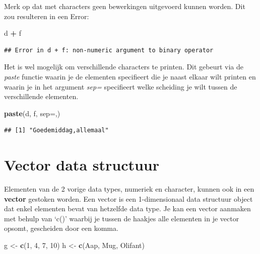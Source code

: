 \documentclass[
]{book}
\newenvironment{Shaded}{\begin{snugshade}}{\end{snugshade}}
\newcommand{\AttributeTok}[1]{\textcolor[rgb]{0.13,0.29,0.53}{#1}}
\newcommand{\DecValTok}[1]{\textcolor[rgb]{0.00,0.00,0.81}{#1}}
\newcommand{\FunctionTok}[1]{\textcolor[rgb]{0.13,0.29,0.53}{\textbf{#1}}}
\newcommand{\NormalTok}[1]{#1}
\newcommand{\OtherTok}[1]{\textcolor[rgb]{0.56,0.35,0.01}{#1}}
\newcommand{\SpecialCharTok}[1]{\textcolor[rgb]{0.81,0.36,0.00}{\textbf{#1}}}
\newcommand{\StringTok}[1]{\textcolor[rgb]{0.31,0.60,0.02}{#1}}
\begin{document}
Merk op dat met characters geen bewerkingen uitgevoerd kunnen worden.
Dit zou resulteren in een Error:

\begin{Shaded}
\begin{Highlighting}[]
\NormalTok{d }\SpecialCharTok{+}\NormalTok{ f}
\end{Highlighting}
\end{Shaded}

\begin{verbatim}
## Error in d + f: non-numeric argument to binary operator
\end{verbatim}

Het is wel mogelijk om verschillende characters te printen. Dit gebeurt
via de \emph{paste} functie waarin je de elementen specifieert die je naast
elkaar wilt printen en waarin je in het argument \emph{sep=} specifieert welke scheiding je
wilt tussen de verschillende elementen.

\begin{Shaded}
\begin{Highlighting}[]
\FunctionTok{paste}\NormalTok{(d, f, }\AttributeTok{sep=}\StringTok{\textquotesingle{},\textquotesingle{}}\NormalTok{)}
\end{Highlighting}
\end{Shaded}

\begin{verbatim}
## [1] "Goedemiddag,allemaal"
\end{verbatim}

\hypertarget{vector-data-structuur}{%
\section{Vector data structuur}\label{vector-data-structuur}}

Elementen van de 2 vorige data types, numeriek en character, kunnen ook in een
\textbf{vector} gestoken worden. Een vector is een 1-dimensionaal data structuur object dat enkel elementen bevat van hetzelfde data type. Je kan een vector aanmaken met behulp van `c()' waarbij je tussen de haakjes alle elementen in je vector opsomt, gescheiden door een komma.

\begin{Shaded}
\begin{Highlighting}[]
\NormalTok{g }\OtherTok{\textless{}{-}} \FunctionTok{c}\NormalTok{(}\DecValTok{1}\NormalTok{, }\DecValTok{4}\NormalTok{, }\DecValTok{7}\NormalTok{, }\DecValTok{10}\NormalTok{)}
\NormalTok{h }\OtherTok{\textless{}{-}} \FunctionTok{c}\NormalTok{(}\StringTok{\textquotesingle{}Aap\textquotesingle{}}\NormalTok{, }\StringTok{\textquotesingle{}Mug\textquotesingle{}}\NormalTok{, }\StringTok{\textquotesingle{}Olifant\textquotesingle{}}\NormalTok{)}
\end{Highlighting}
\end{Shaded}
\end{document}
